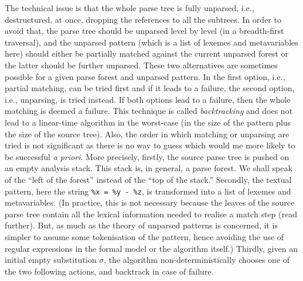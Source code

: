 The technical issue is that the whole parse tree is fully unparsed,
i.e., de\-structured, at once, dropping the references to all the
subtrees. In order to avoid that, the parse tree should be unparsed
level by level (in a breadth\hyp{}first traversal), and the unparsed
pattern (which is a list of lexemes and meta\-variables here) should
either be partially matched against the current unparsed forest or the
latter should be further unparsed. These two alternatives are
sometimes possible for a given parse forest and unparsed pattern. In
the first option, i.e., partial matching, can be tried first and if it
leads to a failure, the second option, i.e., unparsing, is tried
instead. If both options lead to a failure, then the whole matching is
deemed a failure. This technique is called \emph{backtracking} and
does not lead to a linear\hyp{}time algorithm in the worst\hyp{}case
(in the size of the pattern plus the size of the source tree). Also,
the order in which matching or unparsing are tried is not significant
as there is no way to guess which would me more likely to be
successful \emph{a priori}. More precisely, firstly, the source parse
tree is pushed on an empty analysis stack. This stack is, in general,
a parse forest. We shall speak of the ``left of the forest'' instead
of the ``top of the stack.'' Secondly, the textual pattern, here the
string \texttt{\%x = \%y - \%z}, is transformed into a list of lexemes
and meta\-variables. (In practice, this is not necessary because the
leaves of the source parse tree contain all the lexical information
needed to realise a match step (read further). But, as much as the
theory of unparsed patterns is concerned, it is simpler to assume some
tokenisation of the pattern, hence avoiding the use of regular
expressions in the formal model or the algorithm itself.)  Thirdly,
given an initial empty substitution \(\sigma\), the algorithm
non\hyp{}deterministically chooses one of the two following actions,
and backtrack in case of failure.
